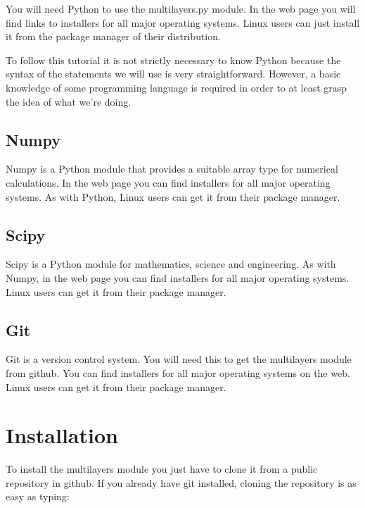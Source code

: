 \documentclass[a4paper,11pt,aps,final]{revtex4}
\begin{document}
You will need \textsf{Python} to use the \textsf{multilayers.py} module. In the web page\cite{python} you will find links to installers for all major operating systems. Linux users can just install it from the package manager of their distribution.

To follow this tutorial it is not strictly necessary to know \textsf{Python} because the syntax of the statements we will use is very straightforward. However, a basic knowledge of some programming language is required in order to at least grasp the idea of what we're doing.

\subsection{\textsf{Numpy}}

\textsf{Numpy} is a \textsf{Python} module that provides a suitable array type for numerical calculations. In the web page\cite{numpy} you can find installers for all major operating systems. As with \textsf{Python}, Linux users can get it from their package manager.

\subsection{\textsf{Scipy}}

\textsf{Scipy} is a \textsf{Python} module for mathematics, science and engineering. As with \textsf{Numpy}, in the web page\cite{scipy} you can find installers for all major operating systems. Linux users can get it from their package manager.

\subsection{\textsf{Git}}

\textsf{Git} is a version control system. You will need this to get the \textsf{multilayers} module from \textsf{github}\cite{github}. You can find installers for all major operating systems on the web\cite{git}. Linux users can get it from their package manager.

\section{Installation}

To install the multilayers module you just have to clone it from a public repository in \textsf{github}\cite{github}. If you already have git installed, cloning the repository is as easy as typing:
\end{document}
